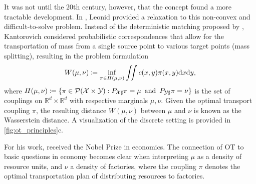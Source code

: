 It was not until the 20th century, however, that the concept found a more tractable development. In \citeyear{kantorovich1942transfer}, Leonid \citeauthor{kantorovich1942transfer} provided a relaxation to this non-convex and difficult-to-solve problem.
Instead of the deterministic matching proposed by \citeauthor{monge1781histoire}, Kantorovich considered probabilistic correspondences that allow for the transportation of mass from a single source point to various target points (mass splitting), resulting in the problem formulation
\begin{equation} \label{eq:kantorovich}
    W(\mu, \nu) \coloneqq \inf_{\pi\in \Pi(\mu,\nu)}\iint c(x, y) \pi(x, y)\mathrm{d}x\mathrm{d}y,
\end{equation}
where $\Pi(\mu, \nu) \coloneqq \left\{\pi \in {\mathcal{P}}(\mathcal{X} \times \mathcal{Y}): P_{{\mathcal{X}} \sharp} \pi=\mu \, \text { and } \, P_{{\mathcal{Y}} \sharp} \pi=\nu\right\}$ is the set of couplings on $\mathbb{R}^d\times\mathbb{R}^d$ with respective marginals $\mu, \nu$. Given the optimal transport coupling $\pi$, the resulting distance $W(\mu, \nu)$ between $\mu$ and $\nu$ is known as the Wasserstein distance.
A visualization of the discrete setting is provided in \cref{fig:ot_principles}c.

For his work, \citeauthor{kantorovich1942transfer} received the Nobel Prize in economics. The connection of \acrshort{OT} to basic questions in economy becomes clear when interpreting $\mu$ as a density of resource units, and $\nu$ a density of factories, where the coupling $\pi$ denotes the optimal transportation plan of distributing resources to factories.


